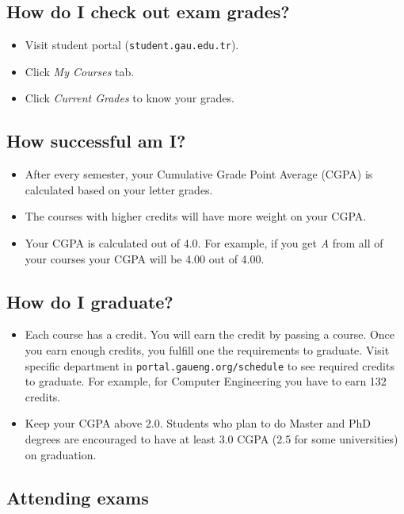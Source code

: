 \documentclass{article}
\begin{document}
\subsection{How do I check out exam grades?}

\begin{itemize}
	\item Visit student portal (\texttt{student.gau.edu.tr}).	
	\item Click \textit{My Courses} tab.
	\item Click \textit{Current Grades} to know your grades.
\end{itemize}

\subsection{How successful am I?}

\begin{itemize}
	\item After every semester, your Cumulative Grade Point Average (CGPA) is calculated based on your letter grades.
	\item The courses with higher credits will have more weight on your CGPA.
	\item Your CGPA is calculated out of 4.0. For example, if you get \textit{A} from all of your courses your CGPA will be 4.00 out of 4.00.
\end{itemize}

\subsection{How do I graduate?}

\begin{itemize}
	\item Each course has a credit. You will earn the credit by passing a course. Once you earn enough credits, you fulfill one the requirements to graduate. Visit specific department in \texttt{portal.gaueng.org/schedule} to see required credits to graduate. For example, for Computer Engineering you have to earn 132 credits.
	\item Keep your CGPA above 2.0. Students who plan to do Master and PhD degrees are encouraged to have at least 3.0 CGPA (2.5 for some universities) on graduation.
\end{itemize}

\subsection{Attending exams}
\end{document}
